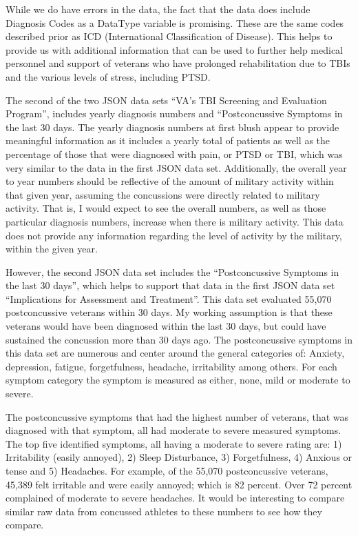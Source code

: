 \documentclass[sigconf]{acmart}
\begin{document}
While we do have errors in the data, the fact that the data does include Diagnosis Codes as a DataType variable is promising.  These are the same codes described prior as ICD (International Classification of Disease).  This helps to provide us with additional information that can be used to further help medical personnel and support of veterans who have prolonged rehabilitation due to TBIs and the various levels of stress, including PTSD.

The second of the two JSON data sets ``VA's TBI Screening and Evaluation Program'', includes yearly diagnosis numbers and ``Postconcussive Symptoms in the last 30 days.  The yearly diagnosis numbers at first blush appear to provide meaningful information as it includes a yearly total of patients as well as the percentage of those that were diagnosed with pain, or PTSD or TBI, which was very similar to the data in the first JSON data set.  Additionally, the overall year to year numbers should be reflective of the amount of military activity within that given year, assuming the concussions were directly related to military activity.  That is, I would expect to see the overall numbers, as well as those particular diagnosis numbers, increase when there is military activity.  This data does not provide any information regarding the level of activity by the military, within the given year.

However, the second JSON data set includes the ``Postconcussive Symptoms in the last 30 days'', which helps to support that data in the first JSON data set ``Implications for Assessment and Treatment''.  This data set evaluated 55,070 postconcussive veterans within 30 days.  My working assumption is that these veterans would have been diagnosed within the last 30 days, but could have sustained the concussion more than 30 days ago.  The postconcussive symptoms in this data set are numerous and center around the general categories of:  Anxiety, depression, fatigue, forgetfulness, headache, irritability among others.  For each symptom category the symptom is measured as either, none, mild or moderate to severe. 

The postconcussive symptoms that had the highest number of veterans, that was diagnosed with that symptom, all had moderate to severe measured symptoms.  The top five identified symptoms, all having a moderate to severe rating are: 1) Irritability (easily annoyed), 2) Sleep Disturbance, 3) Forgetfulness, 4) Anxious or tense and 5) Headaches.  For example, of the 55,070 postconcussive veterans, 45,389 felt irritable and were easily annoyed; which is 82 percent.  Over 72 percent complained of moderate to severe headaches.  It would be interesting to compare similar raw data from concussed athletes to these numbers to see how they compare.  
\end{document}
